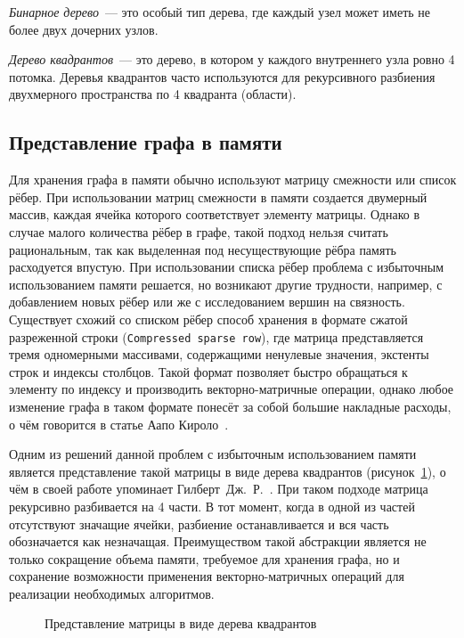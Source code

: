\textit{Бинарное дерево}~---  это особый тип дерева, где каждый узел может иметь не более двух дочерних узлов.

\textit{Дерево квадрантов}~--- это дерево, в котором у каждого внутреннего узла ровно 4 потомка. Деревья квадрантов часто используются для рекурсивного разбиения двухмерного пространства по 4 квадранта (области).

\subsection{Представление графа в памяти}
Для хранения графа в памяти обычно используют матрицу смежности или список рёбер. При использовании матриц смежности в памяти создается двумерный массив, каждая ячейка которого соответствует элементу матрицы. Однако в случае малого количества рёбер в графе, такой подход нельзя считать рациональным, так как выделенная под несуществующие рёбра память расходуется впустую. При использовании списка рёбер проблема с избыточным использованием памяти решается, но возникают другие трудности, например, с добавлением новых рёбер или же с исследованием вершин на связность. Существует схожий со списком рёбер способ хранения в формате сжатой разреженной строки (\texttt{Compressed sparse row}), где матрица представляется тремя одномерными массивами, содержащими ненулевые значения, экстенты строк и индексы столбцов. Такой формат позволяет быстро обращаться к элементу по индексу и производить векторно-матричные операции, однако любое изменение графа в таком формате понесёт за собой большие накладные расходы, о чём говорится в статье Аапо Кироло~\cite{10.5555/2387880.2387884}.

Одним из решений данной проблем с избыточным использованием памяти является представление такой матрицы в виде дерева квадрантов (рисунок~\ref{fig:quadtree}), о чём в своей работе упоминает Гилберт~Дж.~Р.~\cite{bulucc2012parallel}. При таком подходе матрица рекурсивно разбивается на 4 части. В тот момент, когда в одной из частей отсутствуют значащие ячейки, разбиение останавливается и вся часть обозначается как незначащая. Преимуществом такой абстракции является не только сокращение объема памяти, требуемое для хранения графа, но и сохранение возможности применения векторно-матричных операций для реализации необходимых алгоритмов.

\begin{figure}[ht]
    \centering
    \caption{Представление матрицы в виде дерева квадрантов}
    \label{fig:quadtree}
\end{figure}

